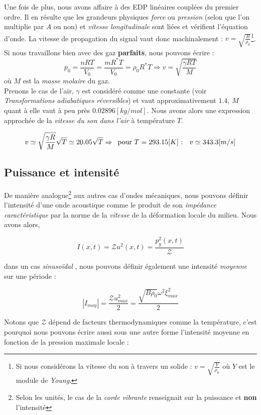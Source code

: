 Une fois de plus, nous avons affaire à des EDP linéaires couplées du premier ordre. Il en résulte que les grandeurs physiques \textit{force} ou \textit{pression} (selon que l'on multiplie par $A$ ou non) et 
\textit{vitesse longitudinale} sont liées et vérifient l'équation d'onde. La vitesse de propagation du signal vaut donc machinalement : $v = \sqrt{\frac{B}{\rho_{0}}}$\footnote{Si nous considérons la vitesse du son à travers un solide : $v = \sqrt{\frac{Y}{\rho_{0}}}$ où $Y$ est le module de \textit{Young}.}.  Si nous travaillons bien avec des
gaz \textbf{parfaits}, nous pouvons écrire : $$p_{0} = \frac{nRT}{V_{0}}= \frac{mR^{*}T}{V_{0}} = \rho_{0}R^{*}T \Rightarrow v = \sqrt{\frac{\gamma RT}{M}}$$ où $M$ est la \textit{masse molaire} du gaz. \\
Prenons le cas de l'air, $\gamma$ est considéré comme une constante (voir \textit{Transformations adiabatiques réversibles}) et vaut approximativement $1.4$, $M$ quant à elle
vaut à peu près $0.02896 [kg/mol]$. Nous avons alors une expression approchée de la \textit{vitesse du son dans l'air} à température $T$. 

\[ v \simeq \sqrt{\frac{\gamma R}{M}} \sqrt{T} \simeq 20.05 \sqrt{T} \Rightarrow \hspace{5 pt} \mbox{pour $T = 293.15[K]$ : } \hspace{5pt} v \simeq 343.3 [m/s]\]

\subsection{Puissance et intensité}

De manière analogue\footnote{Selon les unités, le cas de la \textit{corde vibrante} renseignait sur la puissance et \textbf{non} l'intensité} aux autres cas d'ondes mécaniques, nous pouvons définir l'intensité d'une onde acoustique comme le produit de son \textit{impédance caractéristique}
par la norme de la \textit{vitesse} de la déformation locale du milieu.
Nous avons alors, 

\[I(x,t) = \mathcal{Z} u^{2}(x,t) = \frac{p_{y}^{2}(x,t)}{\mathcal{Z}}\]

dans un cas \textit{sinusoïdal}%
, nous pouvons définir également une intensité \textit{moyenne} sur une période : 

\[ |I_{moy}| = \frac{\mathcal{Z} u^{2}_{max}}{2} = \frac{\sqrt{B \rho_{0}} \omega^{2} \xi_{max}^{2}}{2}\]

Notons que $\mathcal{Z}$ dépend de facteurs thermodynamiques comme la température, c'est pourquoi nous pouvons écrire aussi sous une autre forme l'intensité moyenne en fonction de
la pression maximale locale : 

